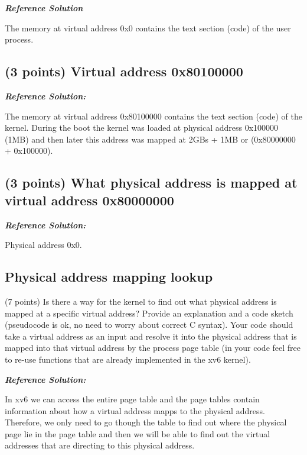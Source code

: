 \documentclass[]{article}
\begin{document}
\textbf{\emph{Reference Solution}}

The memory at virtual address 0x0 contains the text section (code) of
the user process.

\hypertarget{points-virtual-address-0x80100000}{%
\subsection{(3 points) Virtual address
0x80100000}\label{points-virtual-address-0x80100000}}

\textbf{\emph{Reference Solution:}}

The memory at virtual address 0x80100000 contains the text section
(code) of the kernel. During the boot the kernel was loaded at physical
address 0x100000 (1MB) and then later this address was mapped at 2GBs +
1MB or (0x80000000 + 0x100000).

\hypertarget{points-what-physical-address-is-mapped-at-virtual-address-0x80000000}{%
\subsection{(3 points) What physical address is mapped at virtual
address
0x80000000}\label{points-what-physical-address-is-mapped-at-virtual-address-0x80000000}}

\textbf{\emph{Reference Solution:}}

Physical address 0x0.

\hypertarget{physical-address-mapping-lookup}{%
\subsection{Physical address mapping
lookup}\label{physical-address-mapping-lookup}}

(7 points) Is there a way for the kernel to find out what physical
address is mapped at a specific virtual address? Provide an explanation
and a code sketch (pseudocode is ok, no need to worry about correct C
syntax). Your code should take a virtual address as an input and resolve
it into the physical address that is mapped into that virtual address by
the process page table (in your code feel free to re-use functions that
are already implemented in the xv6 kernel).

\textbf{\emph{Reference Solution:}}

In xv6 we can access the entire page table and the page tables contain
information about how a virtual address mapps to the physical address.
Therefore, we only need to go though the table to find out where the
physical page lie in the page table and then we will be able to find out
the virtual addresses that are directing to this physical address.
\end{document}
